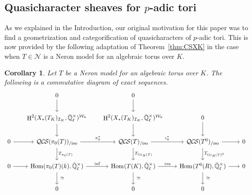\documentclass[10pt]{amsart}
\theoremstyle{plain}
\newtheorem{corollary}[theorem]{Corollary}
\theoremstyle{definition}
\theoremstyle{remark}
\newcommand{\EE}{\mathbb{\bar Q}_\ell}
\newcommand{\Fq}{k}
\newcommand{\EEx}{\EE^\times}
\newcommand{\Weil}[1]{\mathcal{W}_{#1}}
\DeclareMathOperator{\Hom}{Hom}
\DeclareMathOperator{\Gr}{Gr}
\DeclareMathOperator{\Hh}{H}
\newcommand{\iso}{{\ \cong\ }}
\newcommand{\TrFrob}[1]{T_{#1}}
\newcommand{\QCS}{{\mathcal{QC\hskip-0.8pt S}}}
\newcommand{\QCSiso}[1]{\QCS(#1)_{/\text{iso}}}
\begin{document}
\subsection{Quasicharacter sheaves for $p$-adic tori} \label{ssec:CS_tori}

As we explained in the Introduction, our original motivation for this paper was to find a geometrization and categorification of quasicharacters of $p$-adic tori. 
This is now provided by the following adaptation of Theorem~\ref{thm:CSXK} in the case when $T\in \mathcal{N}$ is a Neron model for an algebraic torus over $K$.

\begin{corollary}\label{cor:CS_tori}
Let $T$ be a Neron model for an algebraic torus over $K$.
The following is a commutative diagram of exact sequences.
\[
  \begin{tikzcd}[row sep=20, column sep=18]
{}  & 0 \arrow{d} & 0 \arrow{d} &  & \\ 
   & \Hh^2(X_*(T_K)_{\mathcal{I}_K},\EEx)^{\Weil{\Fq}}  \arrow{d} & \arrow{d} \Hh^2(X_*(T_K)_{\mathcal{I}_K},\EEx)^{\Weil{\Fq}} & 0 \arrow{d} & \\
    0 \rar & \QCSiso{\pi_0(T)} \arrow{r}{\pi_0^*} \dar{\TrFrob{\pi_0(T)}}
    & \QCSiso{T} \arrow{r}{\iota_0^*}  \arrow{d}{\TrFrob{\Gr_R(T)}} & \QCSiso{T^0} \arrow{r} \arrow{d}{\TrFrob{\Gr_R(T)^0}} & 0\\
    0 \arrow{r} & \Hom(\pi_0(T)(\Fq), \EEx) \arrow{r}{\text{inf}} \arrow{d}{\iso}
    & \arrow{d}{\iso} \Hom_\text{}(T(K),\EEx) \arrow{r}{\text{res}} & \Hom_\text{}(T^0(R),\EEx) \arrow{r} \arrow{d}{\iso} & 0\\
 &  0  & 0 & 0 & 
  \end{tikzcd}
 \]
 \end{corollary}
\end{document}
